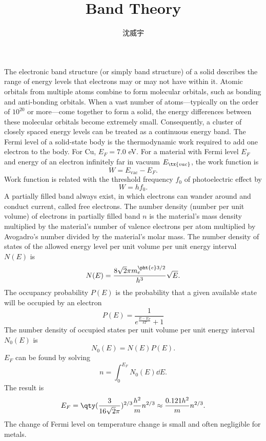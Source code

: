 \documentclass[a4paper,12pt]{article}
\begin{document}
\title{Band Theory}
\author{沈威宇}
\date{\temtoday}
\titletocdoc
{}
The electronic band structure (or simply band structure) of a solid describes the range of energy levels that electrons may or may not have within it.
Atomic orbitals from multiple atoms combine to form molecular orbitals, such as bonding and anti-bonding orbitals. When a vast number of atoms—typically on the order of $10^{20}$ or more—come together to form a solid, the energy differences between these molecular orbitals become extremely small. Consequently, a cluster of closely spaced energy levels can be treated as a continuous energy band.
The Fermi level of a solid-state body is the thermodynamic work required to add one electron to the body. For Cu, $E_F=7.0$ eV.
For a material with Fermi level $E_F$ and energy of an electron infinitely far in vacuum $E_{\tx{vac}}$, the work function is
\[W=E_{\text{vac}}-E_F.\]
Work function is related with the threshold frequency $f_0$ of photoelectric effect by
\[W=hf_0.\]
A partially filled band always exist, in which electrons can wander around and conduct current, called free electrons.
The number density (number per unit volume) of electrons in partially filled band $n$ is the material's mass density multiplied by the material's number of valence electrons per atom multiplied by Avogadro's number divided by the material's molar mass.
The number density of states of the allowed energy level per unit volume per unit energy interval $N(E)$ is
\[N(E)=\frac{8\sqrt{2}\pi m_e^{\pht{e}3/2}}{h^3}\sqrt{E}.\]
The occupancy probability $P(E)$ is the probability that a given available state will be occupied by an electron
\[P(E)=\frac{1}{e^{\frac{E-E_F}{kT}}+1}\]
The number density of occupied states per unit volume per unit energy interval $N_0(E)$ is
\[N_0(E)=N(E)P(E).\]
$E_F$ can be found by solving
\[n=\int_0^{E_F}N_0(E)\dd{E}.\]
The result is
\[E_F=\qty(\frac{3}{16\sqrt{2}\pi})^{2/3}\frac{h^2}{m}n^{2/3}\approx\frac{0.121h^2}{m}n^{2/3}.\]
The change of Fermi level on temperature change is small and often negligible for metals.
\end{document}
